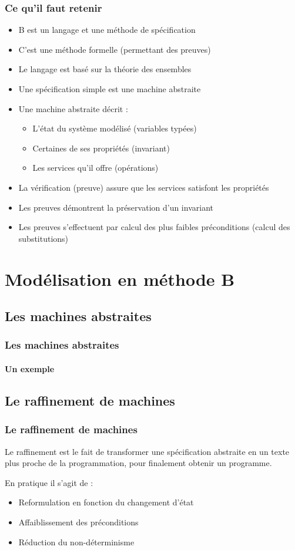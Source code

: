 \documentclass[11pt,a4paper,xcolor=table]{beamer} %
\begin{document}
\begin{frame}
\frametitle{Ce qu'il faut retenir}
\begin{itemize}
\item B est un langage et une méthode de spécification
\item C'est une méthode formelle (permettant des preuves)
\item Le langage est basé sur la théorie des ensembles
\item Une spécification simple est une machine abstraite
\item Une machine abstraite décrit :
\begin{itemize}
\item L'état du système modélisé (variables typées)
\item Certaines de ses propriétés (invariant)
\item Les services qu'il offre (opérations)
\end{itemize}
\item La vérification (preuve) assure que les services satisfont les
propriétés
\item Les preuves démontrent la préservation d'un invariant
\item Les preuves s'effectuent par calcul des plus faibles préconditions
(calcul des substitutions)
\end{itemize}
\end{frame}

\section{Modélisation en méthode B}
\subsection{Les machines abstraites}
\begin{frame}
\frametitle{Les machines abstraites}
\framesubtitle{Un exemple}

\end{frame}

\subsection{Le raffinement de machines}
\begin{frame}
\frametitle{Le raffinement de machines}
Le raffinement est le fait de transformer une spécification abstraite en un texte plus proche de la programmation, pour finalement obtenir un programme.

En pratique il s'agit de :
\begin{itemize}
\item Reformulation en fonction du changement d’état
\item Affaiblissement des préconditions
\item Réduction du non-déterminisme
\end{itemize}

\end{frame}
\end{document}
